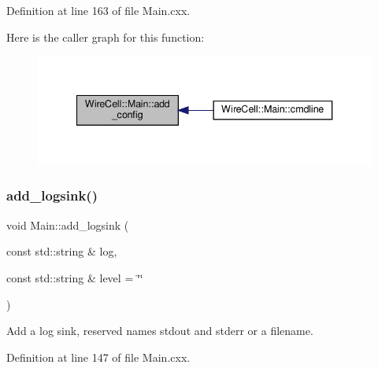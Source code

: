 Definition at line 163 of file Main.\+cxx.

Here is the caller graph for this function\+:
\nopagebreak
\begin{figure}[H]
\begin{center}
\leavevmode
\includegraphics[width=340pt]{class_wire_cell_1_1_main_a9c790104cfb1a5223d041dd10187d2e2_icgraph}
\end{center}
\end{figure}
\mbox{\label{class_wire_cell_1_1_main_a50af5cb3b3f2cfb176febecd4a1613ce}} 
\subsubsection{\texorpdfstring{add\+\_\+logsink()}{add\_logsink()}}
{\footnotesize\ttfamily void Main\+::add\+\_\+logsink (\begin{DoxyParamCaption}\item[{const std\+::string \&}]{log,  }\item[{const std\+::string \&}]{level = {\ttfamily \char`\"{}\char`\"{}} }\end{DoxyParamCaption})}



Add a log sink, reserved names \textquotesingle{}stdout\textquotesingle{} and \textquotesingle{}stderr\textquotesingle{} or a filename. 



Definition at line 147 of file Main.\+cxx.


